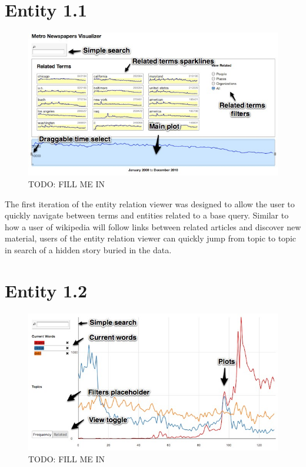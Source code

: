 \section{Entity 1.1}

\begin{figure}[htb]
  \centerline{
    \includegraphics[scale=0.28]{figures/relation-0.jpg}
  }
  \caption{TODO: FILL ME IN}
  \label{fig:explorer-0}
\end{figure}

The first iteration of the entity relation viewer was designed to allow the user to quickly navigate between terms and entities related to a base query. Similar to how a user of wikipedia will follow links between related articles and discover new material, users of the entity relation viewer can quickly jump from topic to topic in search of a hidden story buried in the data.

\section{Entity 1.2}


\begin{figure}[htb]
  \centerline{
    \includegraphics[scale=0.28]{figures/relation-1-a.jpg}
  }
  \caption{TODO: FILL ME IN}
  \label{fig:explorer-1-a}
\end{figure}

